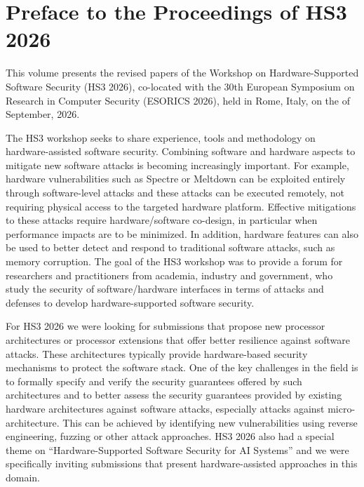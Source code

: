 \documentclass[runningheads]{llncs}
\begin{document}
\frontmatter
\setcounter{page}{5}

\chapter*{Preface to the Proceedings of HS3 2026}

This volume presents the revised papers of the  Workshop on
Hardware-Supported Software Security (HS3 2026), co-located with the 30th
European Symposium on Research in Computer Security (ESORICS 2026), held in
Rome, Italy, on the  of September, 2026.

The HS3 workshop seeks to share experience, tools and methodology on
hardware-assisted software security. Combining software and hardware
aspects to mitigate new software attacks is becoming increasingly
important. For example, hardware vulnerabilities such as Spectre or
Meltdown can be exploited entirely through software-level attacks and these
attacks can be executed remotely, not requiring physical access to the
targeted hardware platform. Effective mitigations to these attacks require
hardware/software co-design, in particular when performance impacts are to
be minimized. In addition, hardware features can also be used to better
detect and respond to traditional software attacks, such as memory
corruption. The goal of the HS3 workshop was to provide a forum for
researchers and practitioners from academia, industry and government, who
study the security of software/hardware interfaces in terms of attacks and
defenses to develop hardware-supported software security.

For HS3 2026 we were looking for submissions that propose new processor
architectures or processor extensions that offer better resilience against
software attacks. These architectures typically provide hardware-based
security mechanisms to protect the software stack. One of the key
challenges in the field is to formally specify and verify the security
guarantees offered by such architectures and to better assess the security
guarantees provided by existing hardware architectures against software
attacks, especially attacks against micro-architecture. This can be
achieved by identifying new vulnerabilities using reverse engineering,
fuzzing or other attack approaches. HS3 2026 also had a special theme on
\enquote{Hardware-Supported Software Security for AI Systems} and
we were specifically inviting submissions that present hardware-assisted
approaches in this domain.
\end{document}

